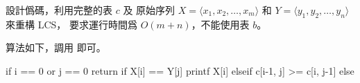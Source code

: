\startEXERCISE
設計僞碼，利用完整的表 $c$ 及
原始序列 $X=\langle x_1, x_2, \ldots, x_m \rangle$
和 $Y=\langle y_1, y_2, \ldots, y_n\rangle$ 來重構 LCS，
要求運行時間爲 $O(m+n)$，不能使用表 $b$。
\stopEXERCISE

\startANSWER
算法如下，調用  即可。

\startCLRSCODE
if i == 0 or j == 0
	return
if X[i] == Y[j]
	printf X[i]
elseif c[i-1, j] >= c[i, j-1]
else
\stopCLRSCODE
\stopANSWER
